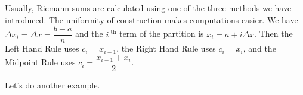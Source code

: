 Usually, Riemann sums are calculated using one of the three methods we have introduced. The uniformity of construction makes computations easier. We have $\Delta x_i = \Delta x = \dfrac{b-a}n$ and the $i^\text{ th}$ term of the partition is $x_i = a + i\Delta x$.  Then the Left Hand Rule uses $c_i=x_{i-1}$, the Right Hand Rule uses $c_i=x_i$, and the Midpoint Rule uses $c_i=\dfrac{x_{i-1}+x_i}{2}$.


%

Let's do another example.

